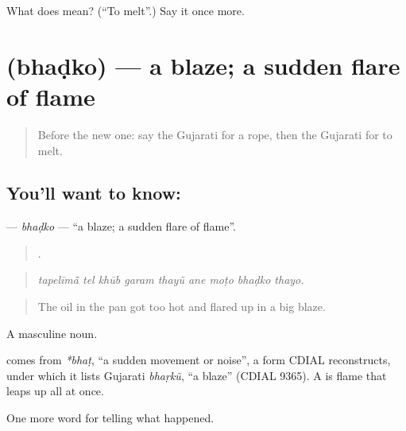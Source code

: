 \begin{tcolorbox}[breakable,colback=teal!4,colframe=teal!35!black,title={Before you move on}]
What does  mean? (\textquotedblleft{}To melt\textquotedblright{}.) Say it once more.
\end{tcolorbox}
\section[\texorpdfstring{\gu{ભડકો} (bhaḍko)}{ભડકો (bhaḍko)}]{ (bhaḍko) — a blaze; a sudden flare of flame}

\label{lesson:GU-C302-bhadko}



\begin{quote}
Before the new one: say the Gujarati for a rope, then the Gujarati for to melt.
\end{quote}

\subsection*{You'll want to know: }
\textbf{} — \emph{bhaḍko} — \textquotedblleft{}a blaze; a sudden flare of flame\textquotedblright{}.

\begin{quote}
        .
\end{quote}

\begin{quote}
\emph{tapelīmā̃ tel khūb garam thayũ ane moṭo bhaḍko thayo.}
\end{quote}

\begin{quote}
The oil in the pan got too hot and flared up in a big blaze.
\end{quote}

A masculine noun.

\begin{cousinweb}
comes from \emph{*bhaṭ}, \textquotedblleft{}a sudden movement or noise\textquotedblright{}, a form CDIAL reconstructs, under which it lists Gujarati \emph{bhaṛkũ}, \textquotedblleft{}a blaze\textquotedblright{} (CDIAL 9365). A \textbf{} is flame that leaps up all at once.
\end{cousinweb}

\begin{grammarlens}[title={What you've built}]
One more word for telling what happened.
\end{grammarlens}

